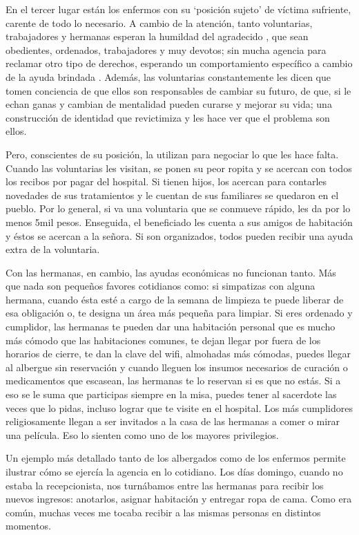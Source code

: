 \documentclass[
  spanish,
  11pt,
  a4paper,
]{scrbook}
\begin{document}
En el tercer lugar están los enfermos con su `posición sujeto' de
víctima sufriente, carente de todo lo necesario. A cambio de la
atención, tanto voluntarias, trabajadores y hermanas esperan la humildad
del agradecido \autocite[14]{Fassin2016}, que sean obedientes,
ordenados, trabajadores y muy devotos; sin mucha agencia para reclamar
otro tipo de derechos, esperando un comportamiento específico a cambio
de la ayuda brindada \autocite[303]{PodgornikJakil2021}. Además, las
voluntarias constantemente les dicen que tomen conciencia de que ellos
son responsables de cambiar su futuro, de que, si le echan ganas y
cambian de mentalidad pueden curarse y mejorar su vida; una construcción
de identidad que revictimiza y les hace ver que el problema son ellos.

Pero, conscientes de su posición, la utilizan para negociar lo que les
hace falta. Cuando las voluntarias les visitan, se ponen su peor ropita
y se acercan con todos los recibos por pagar del hospital. Si tienen
hijos, los acercan para contarles novedades de sus tratamientos y le
cuentan de sus familiares se quedaron en el pueblo. Por lo general, si
va una voluntaria que se conmueve rápido, les da por lo menos 5mil
pesos. Enseguida, el beneficiado les cuenta a sus amigos de habitación y
éstos se acercan a la señora. Si son organizados, todos pueden recibir
una ayuda extra de la voluntaria.

Con las hermanas, en cambio, las ayudas económicas no funcionan tanto.
Más que nada son pequeños favores cotidianos como: si simpatizas con
alguna hermana, cuando ésta esté a cargo de la semana de limpieza te
puede liberar de esa obligación o, te designa un área más pequeña para
limpiar. Si eres ordenado y cumplidor, las hermanas te pueden dar una
habitación personal que es mucho más cómodo que las habitaciones
comunes, te dejan llegar por fuera de los horarios de cierre, te dan la
clave del wifi, almohadas más cómodas, puedes llegar al albergue sin
reservación y cuando lleguen los insumos necesarios de curación o
medicamentos que escasean, las hermanas te lo reservan si es que no
estás. Si a eso se le suma que participas siempre en la misa, puedes
tener al sacerdote las veces que lo pidas, incluso lograr que te visite
en el hospital. Los más cumplidores religiosamente llegan a ser
invitados a la casa de las hermanas a comer o mirar una película. Eso lo
sienten como uno de los mayores privilegios.

Un ejemplo más detallado tanto de los albergados como de los enfermos
permite ilustrar cómo se ejercía la agencia en lo cotidiano. Los días
domingo, cuando no estaba la recepcionista, nos turnábamos entre las
hermanas para recibir los nuevos ingresos: anotarlos, asignar habitación
y entregar ropa de cama. Como era común, muchas veces me tocaba recibir
a las mismas personas en distintos momentos.
\end{document}
